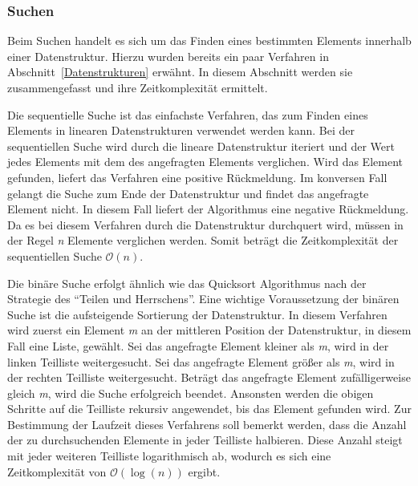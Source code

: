 \subsubsection{Suchen}
Beim Suchen handelt es sich um das Finden eines bestimmten Elements innerhalb einer Datenstruktur. Hierzu wurden bereits ein paar Verfahren in Abschnitt~\ref{Datenstrukturen} erwähnt. In diesem Abschnitt werden sie zusammengefasst und ihre Zeitkomplexität ermittelt. 

Die sequentielle Suche ist das einfachste Verfahren, das zum Finden eines Elements in linearen Datenstrukturen verwendet werden kann. Bei der sequentiellen Suche wird durch die lineare Datenstruktur iteriert und der Wert jedes Elements mit dem des angefragten Elements verglichen. Wird das Element gefunden, liefert das Verfahren eine positive Rückmeldung. Im konversen Fall gelangt die Suche zum Ende der Datenstruktur und findet das angefragte Element nicht. In diesem Fall liefert der Algorithmus eine negative Rückmeldung. Da es bei diesem Verfahren durch die Datenstruktur durchquert wird, müssen in der Regel \textit{n} Elemente verglichen werden. Somit beträgt die Zeitkomplexität der sequentiellen Suche $\mathcal{O}(n)$. \autocite[224]{hubwieser_fundamente_2015}

Die binäre Suche erfolgt ähnlich wie das Quicksort Algorithmus nach der Strategie des \enquote{Teilen und Herrschens}. Eine wichtige Voraussetzung der binären Suche ist die aufsteigende Sortierung der Datenstruktur. In diesem Verfahren wird zuerst ein Element \textit{m} an der mittleren Position der Datenstruktur, in diesem Fall eine Liste, gewählt. Sei das angefragte Element kleiner als \textit{m}, wird in der linken Teilliste weitergesucht. Sei das angefragte Element größer als \textit{m}, wird in der rechten Teilliste weitergesucht. Beträgt das angefragte Element zufälligerweise gleich \textit{m}, wird die Suche erfolgreich beendet. Ansonsten werden die obigen Schritte auf die Teilliste rekursiv angewendet, bis das Element gefunden wird. Zur Bestimmung der Laufzeit dieses Verfahrens soll bemerkt werden, dass die Anzahl der zu durchsuchenden Elemente in jeder Teilliste halbieren. Diese Anzahl steigt mit jeder weiteren Teilliste logarithmisch ab, wodurch es sich eine Zeitkomplexität von $\mathcal{O}(\log(n))$ ergibt. \autocite[224-226]{hubwieser_fundamente_2015}

